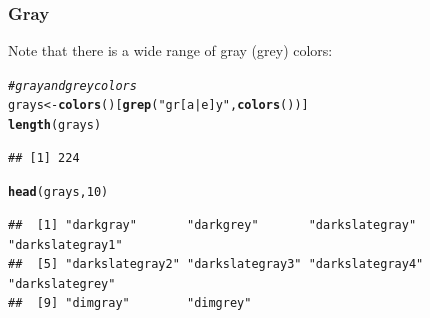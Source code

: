 \documentclass[12pt]{beamer}\usepackage[]{graphicx}\usepackage[]{color}
\makeatletter
\newcommand{\hlnum}[1]{\textcolor[rgb]{0.686,0.059,0.569}{#1}}%
\newcommand{\hlstr}[1]{\textcolor[rgb]{0.192,0.494,0.8}{#1}}%
\newcommand{\hlcom}[1]{\textcolor[rgb]{0.678,0.584,0.686}{\textit{#1}}}%
\newcommand{\hlstd}[1]{\textcolor[rgb]{0.345,0.345,0.345}{#1}}%
\newcommand{\hlkwb}[1]{\textcolor[rgb]{0.69,0.353,0.396}{#1}}%
\newcommand{\hlkwd}[1]{\textcolor[rgb]{0.737,0.353,0.396}{\textbf{#1}}}%
\newenvironment{kframe}{%
 \def\at@end@of@kframe{}%
 \ifinner\ifhmode%
  \def\at@end@of@kframe{\end{minipage}}%
  \begin{minipage}{\columnwidth}%
 \fi\fi%
 \def\FrameCommand##1{\hskip\@totalleftmargin \hskip-\fboxsep
 \colorbox{shadecolor}{##1}\hskip-\fboxsep
     \hskip-\linewidth \hskip-\@totalleftmargin \hskip\columnwidth}%
 \MakeFramed {\advance\hsize-\width
   \@totalleftmargin\z@ \linewidth\hsize
   \@setminipage}}%
 {\par\unskip\endMakeFramed%
 \at@end@of@kframe}
\newenvironment{knitrout}{}{} %
\makeatother
\begin{document}

\begin{frame}[fragile]
\frametitle{Gray }

Note that there is a wide range of gray (grey) colors:
\begin{knitrout}\scriptsize
{}\color{fgcolor}\begin{kframe}
\begin{alltt}
\hlcom{# gray and grey colors}
\hlstd{grays} \hlkwb{<-} \hlkwd{colors}\hlstd{()[}\hlkwd{grep}\hlstd{(}\hlstr{"gr[a|e]y"}\hlstd{,} \hlkwd{colors}\hlstd{())]}
\hlkwd{length}\hlstd{(grays)}
\end{alltt}
\begin{verbatim}
## [1] 224
\end{verbatim}
\begin{alltt}
\hlkwd{head}\hlstd{(grays,} \hlnum{10}\hlstd{)}
\end{alltt}
\begin{verbatim}
##  [1] "darkgray"       "darkgrey"       "darkslategray"  "darkslategray1"
##  [5] "darkslategray2" "darkslategray3" "darkslategray4" "darkslategrey" 
##  [9] "dimgray"        "dimgrey"
\end{verbatim}
\end{kframe}
\end{knitrout}

\end{frame}

\end{document}
